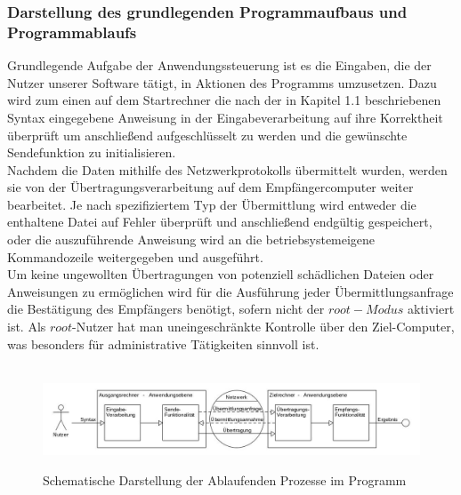 \subsubsection{Darstellung des grundlegenden Programmaufbaus und Programmablaufs}
Grundlegende Aufgabe der Anwendungssteuerung ist es die Eingaben, die der Nutzer unserer Software tätigt, in Aktionen des Programms umzusetzen. 
Dazu wird zum einen auf dem Startrechner die nach der in Kapitel 1.1 beschriebenen Syntax eingegebene Anweisung in der Eingabeverarbeitung auf ihre Korrektheit überprüft um anschließend aufgeschlüsselt zu werden und die gewünschte Sendefunktion zu initialisieren.\\
Nachdem die Daten mithilfe des Netzwerkprotokolls übermittelt wurden, werden sie von der Übertragungsverarbeitung auf dem Empfängercomputer weiter bearbeitet. Je nach spezifiziertem Typ der Übermittlung wird entweder die enthaltene Datei auf Fehler überprüft und anschließend endgültig gespeichert, oder die auszuführende Anweisung wird an die betriebsystemeigene Kommandozeile weitergegeben und ausgeführt.\\
Um keine ungewollten Übertragungen von potenziell schädlichen Dateien oder Anweisungen zu ermöglichen wird für die Ausführung jeder Übermittlungsanfrage die Bestätigung des Empfängers benötigt, sofern nicht der $root-Modus$ aktiviert ist. Als $root$-Nutzer hat man uneingeschränkte Kontrolle über den Ziel-Computer, was besonders für administrative Tätigkeiten sinnvoll ist.\\\hfill\\ 
\begin{figure}[h!]
\centering
\includegraphics[scale=.45]{anw.jpg}
\label{anw}
\caption{Schematische Darstellung der Ablaufenden Prozesse im Programm}
\end{figure}

